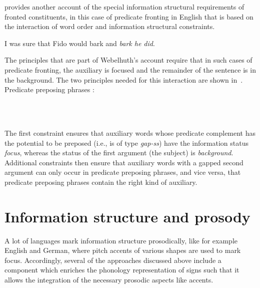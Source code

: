\documentclass[output=paper
	        ,collection
	        ,collectionchapter
 	        ,biblatex
                ,babelshorthands
                ,newtxmath
                ,draftmode
                ,colorlinks, citecolor=brown
]{langscibook}
\begin{document}
\cite{Webelhuth2007a-u} provides another account of the special
information structural requirements of fronted constituents, in this
case of predicate fronting in English that is based on the interaction
of word order and information structural constraints.
\begin{exe}
  \ex I was sure that Fido would bark and \textit{bark he did}.
\end{exe}

The principles that are part of Webelhuth's account require that in such cases
of predicate fronting, the auxiliary is focused and the remainder of
the sentence is in the background. The two
principles needed for this interaction are shown in~.
\ea
Predicate preposing phrases \citep{Webelhuth2007a-u}:\\
\impl\ 

\bigskip
{}
\impl\ 
  

  \label{fig:predicatepreposing}
\z
The first constraint ensures that auxiliary words whose predicate
complement has the potential to be preposed (i.e., is of type \textit{gap-ss}) have the
information status \textit{focus}, whereas the status of the first
argument (the subject) is \textit{background}. Additional constraints
then ensure that auxiliary words with a gapped second argument can
only occur in predicate preposing phrases, and vice versa, that
predicate preposing phrases contain the right kind of auxiliary.

\section{Information structure and prosody}
\label{sec:prosody}
A lot of languages mark information structure  prosodically, like for
example English and German, where pitch accents of various shapes are
used to mark focus. Accordingly, several of the approaches discussed above
include a component which enriches the phonology representation
of signs such that it allows the integration of the necessary prosodic
aspects like accents.
\end{document}
